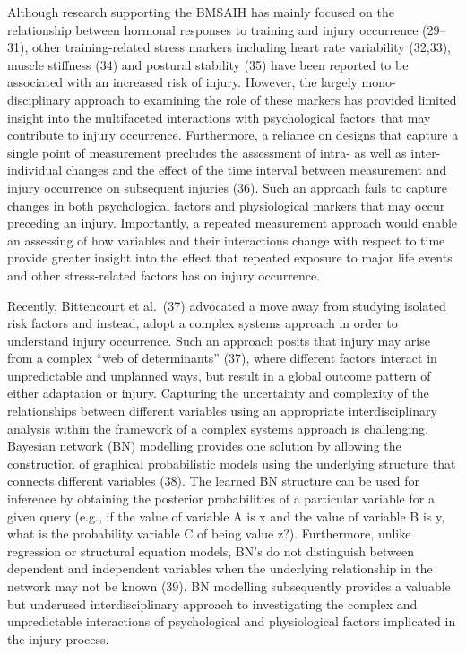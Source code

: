 \documentclass[
  english,
  man]{apa6}
\begin{document}
Although research supporting the BMSAIH has mainly focused on the relationship between hormonal responses to training and injury occurrence (29--31), other training-related stress markers including heart rate variability (32,33), muscle stiffness (34) and postural stability (35) have been reported to be associated with an increased risk of injury. However, the largely mono-disciplinary approach to examining the role of these markers has provided limited insight into the multifaceted interactions with psychological factors that may contribute to injury occurrence.
Furthermore, a reliance on designs that capture a single point of measurement precludes the assessment of intra- as well as inter-individual changes and the effect of the time interval between measurement and injury occurrence on subsequent injuries (36). Such an approach fails to capture changes in both psychological factors and physiological markers that may occur preceding an injury.
Importantly, a repeated measurement approach would enable an assessing of how variables and their interactions change with respect to time provide greater insight into the effect that repeated exposure to major life events and other stress-related factors has on injury occurrence.

Recently, Bittencourt et al.~(37) advocated a move away from studying isolated risk factors and instead, adopt a complex systems approach in order to understand injury occurrence. Such an approach posits that injury may arise from a complex ``web of determinants'' (37), where different factors interact in unpredictable and unplanned ways, but result in a global outcome pattern of either adaptation or injury. Capturing the uncertainty and complexity of the relationships between different variables using an appropriate interdisciplinary analysis within the framework of a complex systems approach is challenging. Bayesian network (BN) modelling provides one solution by allowing the construction of graphical probabilistic models using the underlying structure that connects different variables (38). The learned BN structure can be used for inference by obtaining the posterior probabilities of a particular variable for a given query (e.g., if the value of variable A is x and the value of variable B is y, what is the probability variable C of being value z?). Furthermore, unlike regression or structural equation models, BN's do not distinguish between dependent and independent variables when the underlying relationship in the network may not be known (39). BN modelling subsequently provides a valuable but underused interdisciplinary approach to investigating the complex and unpredictable interactions of psychological and physiological factors implicated in the injury process.
\end{document}
